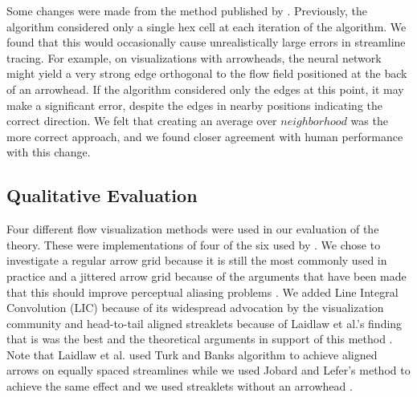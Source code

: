 \documentclass[prodmode,acmtap]{acmlarge}
\begin{document}
Some changes were made from the method published by
. Previously, the algorithm considered only a single
hex cell at each iteration of the algorithm. We found that this would
occasionally cause unrealistically large errors in streamline
tracing. For example, on visualizations with arrowheads, the neural
network might yield a very strong edge orthogonal to the flow field
positioned at the back of an arrowhead. If the algorithm considered
only the edges at this point, it may make a significant error,
despite the edges in nearby positions indicating the correct
direction. We felt that creating an average over $neighborhood$ was
the more correct approach, and we found closer agreement with human
performance with this change.

\subsection{Qualitative Evaluation}
Four different flow visualization methods were used in our evaluation
of the theory. These were implementations of four of the six used by
. We chose to investigate a regular arrow grid
because it is still the most commonly used in practice and a jittered
arrow grid because of the arguments that have been made that this
should improve perceptual aliasing problems \cite{Turk1996}. We added
Line Integral Convolution (LIC) because of its widespread advocation
by the visualization community \cite{Cabral1993} and head-to-tail
aligned streaklets because of Laidlaw et al.'s finding that is was
the best and the theoretical arguments in support of this method
\cite{Ware2008}. Note that Laidlaw et al. used Turk and Banks
algorithm to achieve aligned arrows on equally spaced streamlines
while we used Jobard and Lefer's \citeyear{Jobard1997} method to
achieve the same effect and we used streaklets without an arrowhead
\cite{Fowler1989}.
\end{document}
